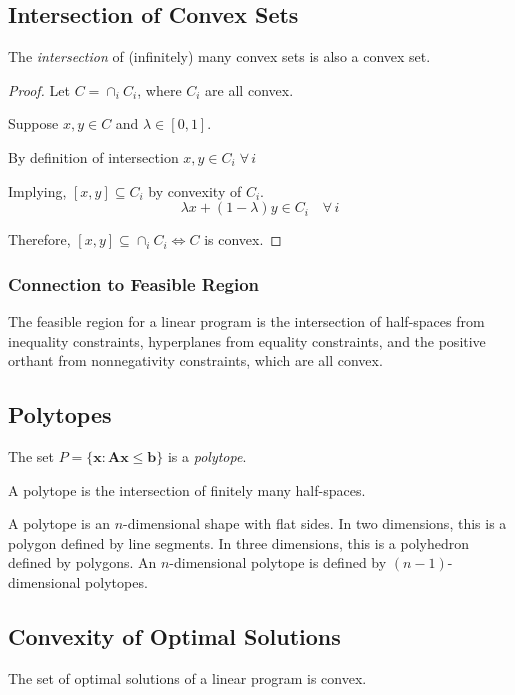 \subsection{Intersection of Convex Sets}
\begin{theorem}
The \emph{intersection} of (infinitely) many convex sets is also a convex set.
\end{theorem}
\begin{proof}
Let $C=\cap_i C_i$, where $C_i$ are all convex.

Suppose $x,y \in C$ and $\lambda \in [0,1]$.

By definition of intersection $x,y \in C_i \; \forall\, i$

Implying, $[x,y]\subseteq C_i$ by convexity of $C_i$.
\begin{equation*}
    \lambda x + (1-\lambda)y \in C_i \quad \forall\, i
\end{equation*}

Therefore, $[x,y]\subseteq \cap_i C_i \iff C$ is convex.
\end{proof}

\subsubsection{Connection to Feasible Region}
The feasible region for a linear program is the intersection of half-spaces from inequality constraints, hyperplanes from equality constraints, and the positive orthant from nonnegativity constraints, which are all convex.


\subsection{Polytopes}
The set $P=\{\mathbf{x:Ax\leq b} \}$ is a \emph{polytope}.
\begin{theorem}
A polytope is the intersection of finitely many half-spaces.
\end{theorem}
A polytope is an $n$-dimensional shape with flat sides. In two dimensions, this is a polygon defined by line segments. In three dimensions, this is a polyhedron defined by polygons. An $n$-dimensional polytope is defined by $(n-1)$-dimensional polytopes.


\subsection{Convexity of Optimal Solutions}
\begin{theorem}
The set of optimal solutions of a linear program is convex.
\end{theorem}

